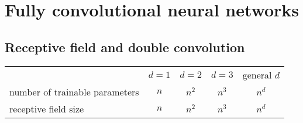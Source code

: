 \documentclass[12pt,a4paper]{article}
\begin{document}
\section{Fully convolutional neural networks}
\subsection{Receptive field and double convolution}


\begin{center}
\begin{tabular}{lcccc}
     &  $d=1$ &  $d=2$ &  $d=3$ & general $d$\\
 number of trainable parameters   &$n$& $n^2$& $n^3$ & $n^d$\\
 receptive field size  &$n$& $n^2$& $n^3$ & $n^d$
\end{tabular}
    \end{center}
\end{document}
